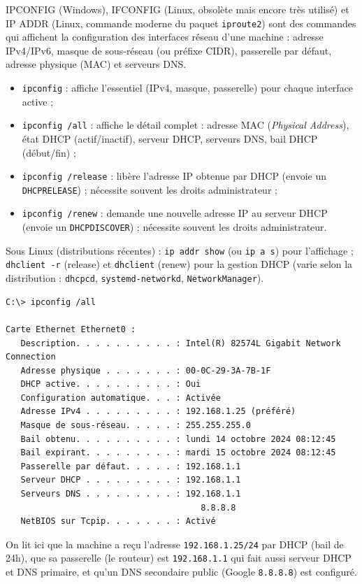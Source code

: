 \documentclass[11pt]{article}
\newcommand{\cle}[1]{{\popxbold\color{popdark}#1}}
\begin{document}
\begin{definition}
\cle{IPCONFIG} (Windows), \cle{IFCONFIG} (Linux, obsolète mais encore très utilisé) et \cle{IP ADDR} (Linux, commande moderne du paquet \texttt{iproute2}) sont des commandes qui affichent la configuration des interfaces réseau d'une machine : adresse IPv4/IPv6, masque de sous-réseau (ou préfixe CIDR), passerelle par défaut, adresse physique (MAC) et serveurs DNS.
\end{definition}

\begin{propriete}
\begin{itemize}
\item \texttt{ipconfig} : affiche l'essentiel (IPv4, masque, passerelle) pour chaque interface active ;
\item \texttt{ipconfig /all} : affiche le détail complet : adresse MAC (\emph{Physical Address}), état DHCP (actif/inactif), serveur DHCP, serveurs DNS, bail DHCP (début/fin) ;
\item \texttt{ipconfig /release} : libère l'adresse IP obtenue par DHCP (envoie un \texttt{DHCPRELEASE}) ; nécessite souvent les droits administrateur ;
\item \texttt{ipconfig /renew} : demande une nouvelle adresse IP au serveur DHCP (envoie un \texttt{DHCPDISCOVER}) ; nécessite souvent les droits administrateur.
\end{itemize}
Sous Linux (distributions récentes) : \texttt{ip addr show} (ou \texttt{ip a s}) pour l'affichage ; \texttt{dhclient -r} (release) et \texttt{dhclient} (renew) pour la gestion DHCP (varie selon la distribution : \texttt{dhcpcd}, \texttt{systemd-networkd}, \texttt{NetworkManager}).
\end{propriete}

\begin{exemplebox}
\begin{lstlisting}
C:\> ipconfig /all

Carte Ethernet Ethernet0 :
   Description. . . . . . . . . . : Intel(R) 82574L Gigabit Network Connection
   Adresse physique . . . . . . . : 00-0C-29-3A-7B-1F
   DHCP active. . . . . . . . . . : Oui
   Configuration automatique. . . : Activée
   Adresse IPv4 . . . . . . . . . : 192.168.1.25 (préféré)
   Masque de sous-réseau. . . . . : 255.255.255.0
   Bail obtenu. . . . . . . . . . : lundi 14 octobre 2024 08:12:45
   Bail expirant. . . . . . . . . : mardi 15 octobre 2024 08:12:45
   Passerelle par défaut. . . . . : 192.168.1.1
   Serveur DHCP . . . . . . . . . : 192.168.1.1
   Serveurs DNS . . . . . . . . . : 192.168.1.1
                                       8.8.8.8
   NetBIOS sur Tcpip. . . . . . . : Activé
\end{lstlisting}
On lit ici que la machine a reçu l'adresse \texttt{192.168.1.25/24} par DHCP (bail de 24h), que sa passerelle (le routeur) est \texttt{192.168.1.1} qui fait aussi serveur DHCP et DNS primaire, et qu'un DNS secondaire public (Google \texttt{8.8.8.8}) est configuré.
\end{exemplebox}
\end{document}
